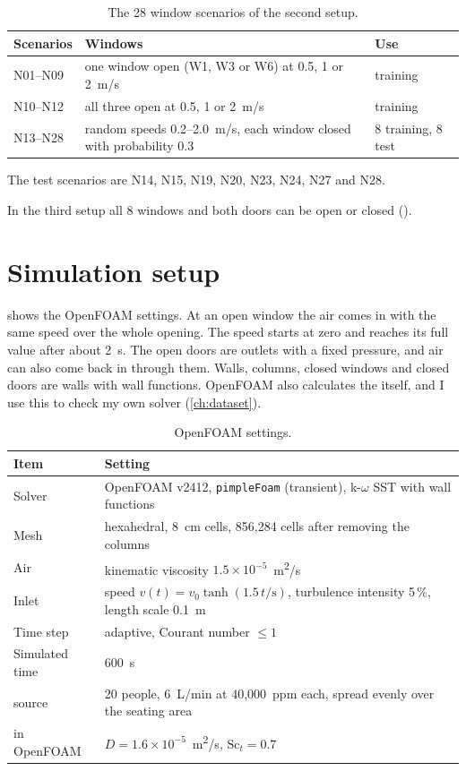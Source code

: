 \begin{table}[h]
  \centering
  \caption{The 28 window scenarios of the second setup.}
  \label{tab:settings}
  \begin{tabular}{l>{\raggedright}p{7.6cm}l}
    \toprule
    Scenarios & Windows & Use\\
    \midrule
    N01--N09 & one window open (W1, W3 or W6) at 0.5, 1 or 2~m/s & training\\
    N10--N12 & all three open at 0.5, 1 or 2~m/s & training\\
    N13--N28 & random speeds 0.2--2.0~m/s, each window closed with probability 0.3 & 8 training, 8 test\\
    \bottomrule
  \end{tabular}
\end{table}
The test scenarios are N14, N15, N19, N20, N23, N24, N27 and N28.

In the third setup all 8 windows and both doors can be open or closed ().

\section{Simulation setup}
 shows the OpenFOAM settings. At an open window the air comes in with the same speed over the
whole opening. The speed starts at zero and reaches its full value after about 2~s. The open doors are
outlets with a fixed pressure, and air can also come back in through them. Walls, columns, closed windows and
closed doors are walls with wall functions. OpenFOAM also calculates the \cotwo{} itself, and I use this to
check my own \cotwo{} solver (\cref{ch:dataset}).

\begin{table}[h]
  \centering
  \caption{OpenFOAM settings.}
  \label{tab:sim}
  \begin{tabular}{>{\raggedright}p{4.2cm}p{9.5cm}}
    \toprule
    Item & Setting\\
    \midrule
    Solver & OpenFOAM v2412, \texttt{pimpleFoam} (transient), k-$\omega$ SST with wall functions\\
    Mesh & hexahedral, 8~cm cells, 856,284 cells after removing the columns\\
    Air & kinematic viscosity $1.5\times10^{-5}$~m\textsuperscript{2}/s\\
    Inlet & speed $v(t)=v_0\tanh(1.5\,t/\mathrm{s})$, turbulence intensity 5\,\%, length scale 0.1~m\\
    Time step & adaptive, Courant number $\le 1$\\
    Simulated time & 600~s\\
    \cotwo{} source & 20 people, 6~L/min at 40,000~ppm each, spread evenly over the seating area\\
    \cotwo{} in OpenFOAM & $D=1.6\times10^{-5}$~m\textsuperscript{2}/s, $\mathrm{Sc}_t=0.7$\\
    \bottomrule
  \end{tabular}
\end{table}

